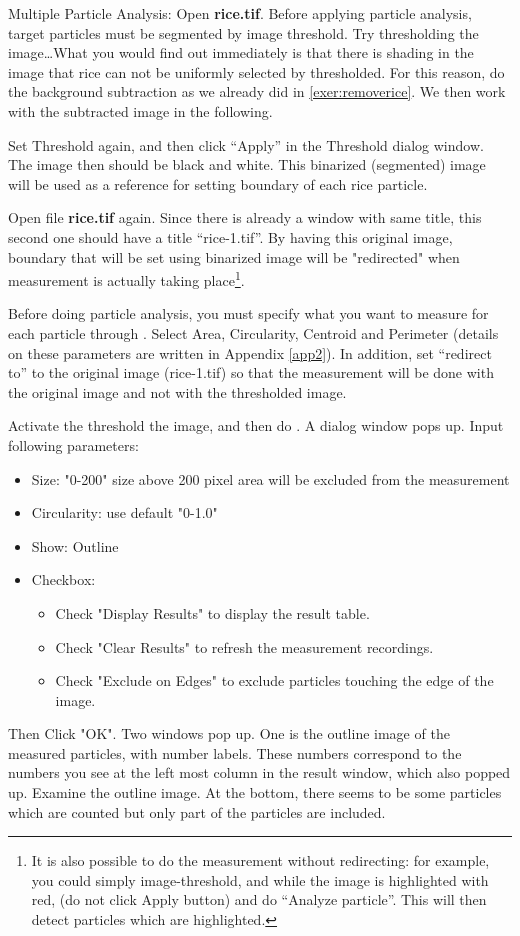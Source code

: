 \begin{indentexercise}{2}
\item Multiple Particle Analysis: Open \textbf{rice.tif}. Before applying particle analysis, target
particles must be segmented by image threshold. Try thresholding the
image\ldots What you would find out immediately is that there is shading in
the image that rice can not be uniformly selected by thresholded. For this reason, do the
background subtraction as we already did in \ref{exer:removerice}. 
We then work with the subtracted image in the
following.

Set Threshold again, and then click ``Apply'' in the Threshold dialog window. 
The image then should be black and white. This binarized (segmented) image 
will be used as a reference for setting boundary of each rice particle. 

Open file \textbf{rice.tif} again. Since there is already a window with same title, this second one 
should have a title ``rice-1.tif''. By having this original image, boundary that will be set using binarized image 
will be "redirected" when measurement is actually taking place\footnote{ It is also possible to 
do the measurement without redirecting: for example, you could simply image-threshold, and while the image is highlighted with red, (do not click Apply button) and do ``Analyze particle''. This will then detect particles which are highlighted.}. 

Before doing particle analysis, you must specify what you want to
measure for each particle through . Select Area, Circularity, Centroid and Perimeter
(details on these parameters are written in Appendix \ref{app2}).
In addition, set ``redirect to'' to the original image (rice-1.tif) so
that the measurement will be done with the original image and not with 
the thresholded image. 

Activate the threshold the image, and then do . A dialog window pops up. Input following
parameters:
\begin{itemize}
\item Size: "0-200" size above 200 pixel area will be excluded from the measurement
\item Circularity: use default "0-1.0"
\item Show: Outline
\item Checkbox:
\begin{itemize} 
\item Check "Display Results" to display the result table.
\item Check "Clear Results" to refresh the measurement recordings.
\item Check "Exclude on Edges" to exclude particles touching the edge of the image. 
\end{itemize}
\end{itemize}
Then Click "OK". Two windows pop up. One
is the outline image of the measured particles, with number labels.
These numbers correspond to the numbers you see at the left most column
in the result window, which also popped up. Examine the outline image.
At the bottom, there seems to be some particles which are counted but
only part of the particles are included. 


\end{indentexercise}

